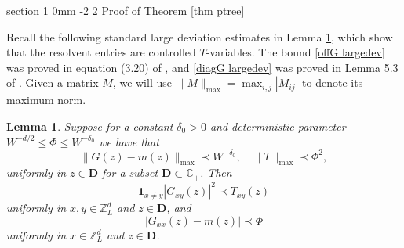 \documentclass{article}
\makeatletter
\newcommand{\1}{\mathds{1}}
\numberwithin{equation}{section}
\newcommand{\be}{\begin{equation}}
\newcommand{\ee}{\end{equation}}
\renewcommand{\leq}{\leqslant}
\renewcommand{\le}{\leq}
\newcommand{\C}{\mathbb{C}}
\newcommand{\Z}{\mathbb{Z}}
\theoremstyle{plain} %
\newtheorem{lemma}[theorem]{Lemma}
\theoremstyle{remark}
\renewcommand{\section}{\@startsection
	{section}%
	{1}%
	{0mm}%
	{-2\baselineskip}%
	{2\baselineskip}%
	{\normalfont\large\scshape\centering}} %
\makeatother
\begin{document}
 
 \section{Proof of Theorem \ref{thm ptree}} \label{sec_pflocal}


Recall the following standard large deviation estimates in Lemma \ref{lem G<T}, which show that the resolvent entries are controlled $T$-variables. The bound \eqref{offG largedev} was proved in equation (3.20) of \cite{PartIII}, and \eqref{diagG largedev} was proved in Lemma 5.3 of \cite{delocal}. Given a matrix $M$, we will use $\|M\|_{\max}=\max_{i,j}|M_{ij}|$ to denote its maximum norm. 

\begin{lemma}\label{lem G<T}
	Suppose for a constant $\delta_0>0$ and deterministic parameter $W^{-d/2}\le \Phi\le W^{-\delta_0}$ we have that
	\be\label{initialGT} 
	\|G(z)-m(z)\|_{\max}\prec W^{-\delta_0},\quad \|T\|_{\max} \prec \Phi^2 ,
	\ee
	uniformly in $z\in \mathbf D$ for a subset $\mathbf D\subset \C_+$. Then 
	\be\label{offG largedev} \mathbf 1_{x\ne y} |G_{xy}(z)|^2  \prec T_{xy}(z)\ee
	uniformly in $x, y \in \Z_L^d$ and $z\in \mathbf D$, and
	\be\label{diagG largedev} |G_{xx}(z)-m(z)| \prec \Phi
	\ee
	uniformly in $x\in \Z_L^d$ and $z\in \mathbf D$.
\end{lemma}
 
 
 
\end{document}
